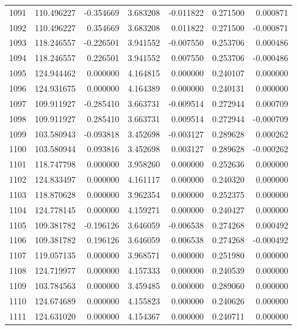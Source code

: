 \begin{tabular}{rrrrrrr}
1091 & 110.496227 &   -0.354669 &  3.683208 &   -0.011822 &    0.271500 &  0.000871 \\
1092 & 110.496227 &    0.354669 &  3.683208 &    0.011822 &    0.271500 & -0.000871 \\
1093 & 118.246557 &   -0.226501 &  3.941552 &   -0.007550 &    0.253706 &  0.000486 \\
1094 & 118.246557 &    0.226501 &  3.941552 &    0.007550 &    0.253706 & -0.000486 \\
1095 & 124.944462 &    0.000000 &  4.164815 &    0.000000 &    0.240107 &  0.000000 \\
1096 & 124.931675 &    0.000000 &  4.164389 &    0.000000 &    0.240131 &  0.000000 \\
1097 & 109.911927 &   -0.285410 &  3.663731 &   -0.009514 &    0.272944 &  0.000709 \\
1098 & 109.911927 &    0.285410 &  3.663731 &    0.009514 &    0.272944 & -0.000709 \\
1099 & 103.580943 &   -0.093818 &  3.452698 &   -0.003127 &    0.289628 &  0.000262 \\
1100 & 103.580944 &    0.093816 &  3.452698 &    0.003127 &    0.289628 & -0.000262 \\
1101 & 118.747798 &    0.000000 &  3.958260 &    0.000000 &    0.252636 &  0.000000 \\
1102 & 124.833497 &    0.000000 &  4.161117 &    0.000000 &    0.240320 &  0.000000 \\
1103 & 118.870628 &    0.000000 &  3.962354 &    0.000000 &    0.252375 &  0.000000 \\
1104 & 124.778145 &    0.000000 &  4.159271 &    0.000000 &    0.240427 &  0.000000 \\
1105 & 109.381782 &   -0.196126 &  3.646059 &   -0.006538 &    0.274268 &  0.000492 \\
1106 & 109.381782 &    0.196126 &  3.646059 &    0.006538 &    0.274268 & -0.000492 \\
1107 & 119.057135 &    0.000000 &  3.968571 &    0.000000 &    0.251980 &  0.000000 \\
1108 & 124.719977 &    0.000000 &  4.157333 &    0.000000 &    0.240539 &  0.000000 \\
1109 & 103.784563 &    0.000000 &  3.459485 &    0.000000 &    0.289060 &  0.000000 \\
1110 & 124.674689 &    0.000000 &  4.155823 &    0.000000 &    0.240626 &  0.000000 \\
1111 & 124.631020 &    0.000000 &  4.154367 &    0.000000 &    0.240711 &  0.000000 \\

\end{tabular}
